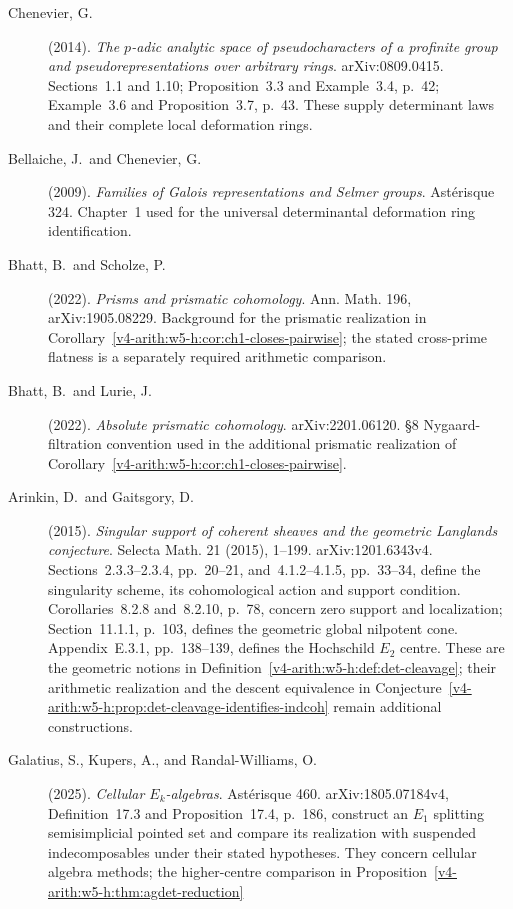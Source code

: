 \begin{description}
\item[Chenevier, G.] (2014). \emph{The $p$-adic analytic space of
pseudocharacters of a profinite group and pseudorepresentations over
arbitrary rings}. arXiv:0809.0415. Sections~1.1 and 1.10;
Proposition~3.3 and Example~3.4, p.~42;
Example~3.6 and Proposition~3.7, p.~43. These supply determinant
laws and their complete local deformation rings.
\item[Bellaiche, J.\ and Chenevier, G.] (2009). \emph{Families of
Galois representations and Selmer groups}. Ast\'erisque 324.
Chapter~1 used for the universal determinantal deformation ring
identification.
\item[Bhatt, B.\ and Scholze, P.] (2022). \emph{Prisms and prismatic
cohomology}. Ann. Math. 196, arXiv:1905.08229. Background for
the prismatic realization in
Corollary~\ref{v4-arith:w5-h:cor:ch1-closes-pairwise}; the stated
cross-prime flatness is a separately required arithmetic comparison.
\item[Bhatt, B.\ and Lurie, J.] (2022). \emph{Absolute prismatic
cohomology}. arXiv:2201.06120. \S8 Nygaard-filtration convention
used in the additional prismatic realization of
Corollary~\ref{v4-arith:w5-h:cor:ch1-closes-pairwise}.
\item[Arinkin, D.\ and Gaitsgory, D.] (2015). \emph{Singular support
of coherent sheaves and the geometric Langlands conjecture}. Selecta
Math. 21 (2015), 1--199. arXiv:1201.6343v4.
Sections~2.3.3--2.3.4, pp.~20--21, and~4.1.2--4.1.5, pp.~33--34,
define the singularity scheme, its cohomological action and support
condition. Corollaries~8.2.8 and~8.2.10, p.~78, concern zero support
and localization; Section~11.1.1, p.~103, defines the geometric global
nilpotent cone. Appendix~E.3.1, pp.~138--139, defines the Hochschild
$E_2$ centre. These are the geometric notions in
Definition~\ref{v4-arith:w5-h:def:det-cleavage}; their arithmetic
realization and the descent equivalence in
Conjecture~\ref{v4-arith:w5-h:prop:det-cleavage-identifies-indcoh}
remain additional constructions.
\item[Galatius, S., Kupers, A., and Randal-Williams, O.] (2025).
\emph{Cellular $E_k$-algebras}. Ast\'erisque 460.
arXiv:1805.07184v4, Definition~17.3 and Proposition~17.4, p.~186,
construct an $E_1$ splitting semisimplicial pointed set and compare
its realization with suspended indecomposables under their stated
hypotheses. They concern cellular algebra methods; the higher-centre
comparison in Proposition~\ref{v4-arith:w5-h:thm:agdet-reduction}

\end{description}
